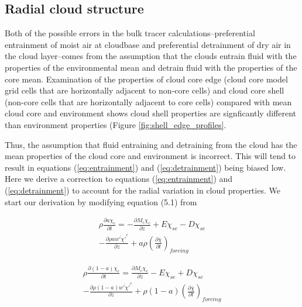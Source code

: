 \documentclass[12pt]{article}
\begin{document}

\subsection{Radial cloud structure}

Both of the possible errors in the bulk tracer calculations--preferential
entrainment of moist air at cloudbase and preferential detrainment of dry air
in the cloud layer--comes from the assumption that the clouds entrain fluid
with the properties of the environmental mean and detrain fluid with the
properties of the core mean.  Examination of the properties of cloud core edge
(cloud core model grid cells that are horizontally adjacent to non-core cells)
and cloud core shell (non-core cells that are horizontally adjacent to core
cells) compared with mean cloud core and environment shows cloud shell
properties are signficantly different than environment properties (Figure 
\ref{fig:shell_edge_profiles}.

Thus, the assumption that fluid entraining and detraining from the cloud has 
the mean properties of the cloud core and environment is incorrect.  This will 
tend to result in equations (\ref{eq:entrainment}) and (\ref{eq:detrainment}) 
being biased low.  Here we derive a correction to equations 
(\ref{eq:entrainment}) and (\ref{eq:detrainment}) to account for the radial 
variation in cloud properties.  We start our derivation by modifying equation 
(5.1) from \cite{Siebesma1995}

\begin{equation}
  \label{eq:derivation_entrainment}
  \begin{split}
    \rho \frac{\partial a \chi_c}{\partial t} 
    = - \frac{\partial M_c \chi_c}{\partial z} 
    + E \chi_{se} - D \chi_{sc} \\
    - \frac{\partial \rho a \overline{w' \chi'}^c}{\partial z} 
    + a \rho \left(\frac{\partial \bar{\chi}}{\partial t}\right)_{forcing}
  \end{split}
\end{equation}

\begin{equation}
  \label{eq:derivation_detrainment}
  \begin{split}
    \rho \frac{\partial (1 - a) \chi_e}{\partial t}
    = \frac{\partial M_c \chi_e}{\partial z} 
    - E \chi_{se} + D \chi_{sc} \\
    - \frac{\partial \rho (1 - a) \overline{w' \chi'}^e}{\partial z} 
    + \rho (1 - a) \left(\frac{\partial \bar{\chi}}{\partial t}\right)_{forcing}
  \end{split}
\end{equation}
\end{document}
